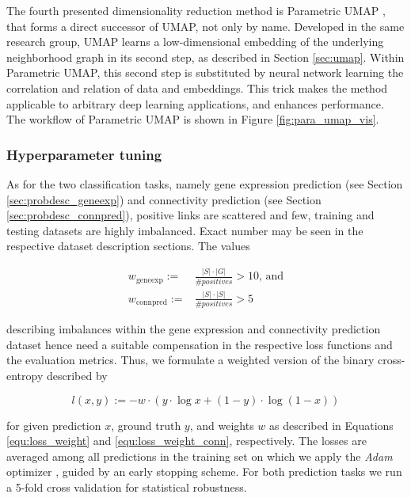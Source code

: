 \documentclass[]{article}
\renewcommand{\cite}{\citep}
\begin{document}
The fourth presented dimensionality reduction method is Parametric UMAP \cite{sainburg2021parametric}, that forms a direct successor of UMAP, not only by name. Developed in the same research group, UMAP learns a low-dimensional embedding of the underlying neighborhood graph in its second step, as described in Section \ref{sec:umap}. Within Parametric UMAP, this second step is substituted by neural network learning the correlation and relation of data and embeddings. This trick makes the method applicable to arbitrary deep learning applications, and enhances performance. The workflow of Parametric UMAP is shown in Figure \ref{fig:para_umap_vis}.

\subsubsection{Hyperparameter tuning}
\label{sec:hyperparameter_tuning}
As for the two classification tasks, namely gene expression prediction (see Section \ref{sec:probdesc_geneexp}) and connectivity prediction (see Section \ref{sec:probdesc_connpred}), positive links are scattered and few, training and testing datasets are highly imbalanced. Exact number may be seen in the respective dataset description sections.
The values

\begin{align}
	\label{equ:loss_weight}
	w_\text{geneexp}:=&\frac{|S| \cdot |G|}{\#positives} > 10 \text{, and}\\
	\label{equ:loss_weight_conn}
	w_\text{connpred}:=&\frac{|S| \cdot |S|}{\#positives} > 5
\end{align}

describing imbalances within the gene expression and connectivity prediction dataset hence need a suitable compensation in the respective loss functions and the evaluation metrics. Thus, we formulate a weighted version of the binary cross-entropy described by

\begin{equation}
	l(x,y):= -w\cdot\left( y\cdot \log x + (1-y)\cdot\log(1-x) \right)
\end{equation}

for given prediction $x$, ground truth $y$, and weights $w$ as described in Equations \ref{equ:loss_weight} and \ref{equ:loss_weight_conn}, respectively. The losses are averaged among all predictions in the training set on which we apply the \textit{Adam} optimizer \cite{Adam2014}, guided by an early stopping scheme. For both prediction tasks we run a 5-fold cross validation for statistical robustness.\\
\end{document}
